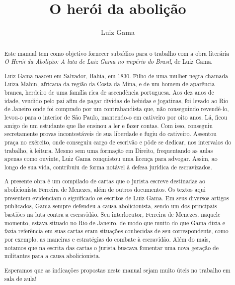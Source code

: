 \documentclass[12pt]{extarticle}
\begin{document}
\newcommand{\AutorLivro}{Luiz Gama}
\newcommand{\TituloLivro}{O herói da abolição}
\newcommand{\Tema}{Diálogos com a sociologia e com a antropologia}
\newcommand{\Genero}{Diário, biografia, autobiografia, relatos, memórias}
\newcommand{\imagemCapa}{./images/PNLD0016-01.png}
\newcommand{\issnppub}{---}
\newcommand{\issnepub}{---}
\newcommand{\colaborador}{{Eduardo Modesto de Carvalho, Bruno Gradella e Vicente Castro}}


\title{\TituloLivro}
\author{\AutorLivro}
\def\authornotes{\colaborador}

\date{}
\maketitle


\baselineskip\par

\begin{abstract}
Este manual tem como objetivo fornecer subsídios para o trabalho com a
obra literária \emph{O Herói da Abolição: A luta de Luiz Gama no império
do Brasil}, de Luiz Gama.

Luiz Gama nasceu em Salvador, Bahia, em 1830. Filho de uma mulher negra chamada 
Luiza Mahin, africana da região da Costa da Mina, e de um homem de aparência branca, 
herdeiro de uma família rica de ascendência portuguesa. Aos dez anos de idade, vendido 
pelo pai afim de pagar dívidas de bebidas e jogatinas, foi levado ao Rio de Janeiro 
onde foi comprado por um contrabandista que, não conseguindo revendê-lo, levou-o
para o interior de São Paulo, mantendo-o em cativeiro por oito anos. Lá, ficou amigo 
de um estudante que lhe ensinou a ler e fazer contas. Com isso, conseguiu secretamente 
provas incontestáveis de sua liberdade e fugiu do cativeiro. Assentou praça no exército, 
onde conseguiu cargo de escrivão e pôde se dedicar, nos intervalos do trabalho, à leitura. 
Mesmo sem uma formação em Direito, frequentando as aulas apenas como ouvinte, 
Luiz Gama conquistou uma licença para advogar. Assim, ao longo de sua vida,
contribuiu de forma notável à defesa jurídica de escravizados. 

A presente obra é um compilado de cartas que o jurista escreve 
destinadas ao abolicionista Ferreira de Menezes, além de outros documentos. Os 
textos aqui presentem evidenciam o significado os escritos de Luiz Gama. 
Em seus diversos artigos publicados, Gama 
sempre defendeu a causa abolicionista, sendo um dos principais bastiões na luta 
contra a escravidão. Seu interlocutor, Ferreira de Menezes, naquele momento, 
estava situado no Rio de Janeiro, de modo que muito do que Gama dizia e fazia 
referência em suas cartas eram situações conhecidas de seu correspondente, 
como por exemplo, as maneiras e estratégias do combate à escravidão. 
Além do mais, notamos que na escrita das cartas o jurista buscava fomentar uma 
nova geração de militantes para a causa abolicionista.

Esperamos que as indicações propostas neste manual sejam muito úteis no trabalho em
sala de aula! 
\end{abstract}
\end{document}
